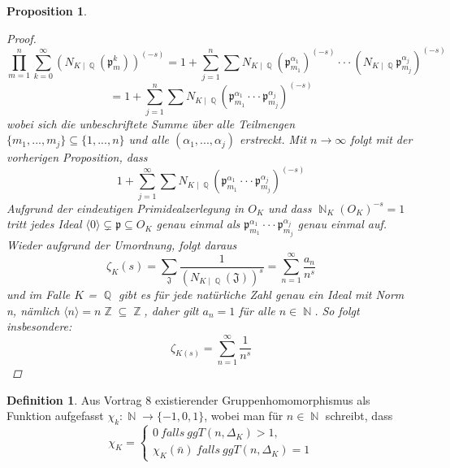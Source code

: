 \documentclass[10pt,a4paper]{article}
\theoremstyle{plain}
\newtheorem{prop}[thm]{Proposition}
\theoremstyle{definition}
\newtheorem{defn}{Definition}[section]
\theoremstyle{remark}
\DeclareMathOperator{\Q}{\mathbb{Q}}
\DeclareMathOperator{\Z}{\mathbb{Z}}
\DeclareMathOperator{\N}{\mathbb{N}}
\begin{document}
\begin{prop}
\begin{proof}
$$\prod_{m=1}^{n}\sum_{k=0}^{\infty}(N_{K\mid \Q}(\mathfrak{p}_m^k))^{(-s)}=1+\sum_{j=1}^{n}\sum N_{K\mid \Q}(\mathfrak{p}_{m_1}^{\alpha_1})^{(-s)}\cdot\cdot\cdot(N_{K\mid \Q}\mathfrak{p}_{m_j}^{\alpha_j})^{(-s)}$$ $$=1+\sum_{j=1}^{n}\sum N_{K\mid \Q}(\mathfrak{p}_{m_1}^{\alpha_1}\cdot\cdot\cdot\mathfrak{p}_{m_j}^{\alpha_j})^{(-s)}$$
wobei sich die unbeschriftete Summe über alle Teilmengen $\{m_{1},...,m_{j}\}\subseteq \{ 1,...,n\}$ und alle $(\alpha_1,...,\alpha_j)$ erstreckt. Mit $n \rightarrow \infty$ folgt mit der vorherigen Proposition, dass $$1+\sum_{j=1}^{\infty}\sum N_{K\mid \Q}(\mathfrak{p}_{m_1}^{\alpha_1}\cdot\cdot\cdot\mathfrak{p}_{m_j}^{\alpha_j})^{(-s)}$$
Aufgrund der eindeutigen Primidealzerlegung in $O_K$ und dass $\N_K(O_K)^{-s}=1$ tritt jedes Ideal $\langle0\rangle\subsetneq \mathfrak{p} \subseteq O_{\textit{K}}$ genau einmal als $\mathfrak{p}_{m_1}^{\alpha_1}\cdot\cdot\cdot\mathfrak{p}_{m_j}^{\alpha_j}$ genau einmal auf. Wieder aufgrund der Umordnung, folgt daraus $$\zeta_{K}(s) = \sum_{\mathfrak{J}}\frac{1}{(N_{K\mid\Q}(\mathfrak{J}))^s}=\sum_{n=1}^{\infty}\frac{a_n}{n^s}$$ und im Falle $\textit{K}$ = $\Q$ gibt es für jede natürliche Zahl genau ein Ideal mit Norm n, nämlich $\langle n\rangle=n\Z\subseteq \Z$, daher gilt $a_n=1$ für alle $n\in \N$. So folgt insbesondere: $$\zeta_{K(s)}= \sum_{n=1}^{\infty}\frac{1}{n^s}$$

\end{proof}
\end{prop}

\begin{defn}

Aus Vortrag 8 existierender Gruppenhomomorphismus als Funktion aufgefasst $\chi_k \colon \N \rightarrow \{-1,0,1 \}$, wobei man für $n \in \N$ schreibt, dass $$\chi_K=\begin{cases}0 \ falls \ ggT(n,\Delta_K) >1,\\\chi_{K}(\bar{n})\ falls\ ggT(n,\Delta_K) =1\end{cases}$$

\end{defn}
\end{document}
